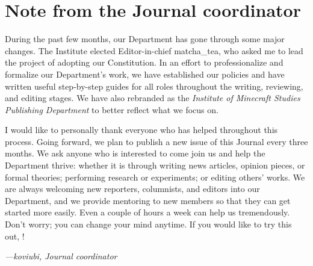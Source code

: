 \chapter*{Note from the Journal coordinator}

During the past few months, our Department has gone through some major changes. The Institute elected Editor-in-chief matcha\_tea, who asked me to lead the project of adopting our Constitution. In an effort to professionalize and formalize our Department's work, we have established our policies and have written useful step-by-step guides for all roles throughout the writing, reviewing, and editing stages. We have also rebranded as the \textit{Institute of Minecraft Studies Publishing Department} to better reflect what we focus on.

I would like to personally thank everyone who has helped throughout this process. Going forward, we plan to publish a new issue of this Journal every three months. We ask anyone who is interested to come join us and help the Department thrive: whether it is through writing news articles, opinion pieces, or formal theories; performing research or experiments; or editing others' works. We are always welcoming new reporters, columnists, and editors into our Department, and we provide mentoring to new members so that they can get started more easily. Even a couple of hours a week can help us tremendously. Don't worry; you can change your mind anytime. If you would like to try this out, !

\begin{flushright}
    \textit{---koviubi, Journal coordinator}
\end{flushright}